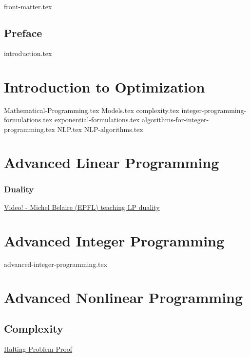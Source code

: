 \documentclass[letter,11pt]{book}
\begin{document}
 
  
{front-matter.tex}



\chapter*{Preface}



{introduction.tex}
\tableofcontents

\part{Introduction to Optimization}
{Mathematical-Programming.tex}
{Models.tex}
{complexity.tex}
{integer-programming-formulations.tex}
{exponential-formulations.tex}
{algorithms-for-integer-programming.tex}
{NLP.tex}
{NLP-algorithms.tex}
\part{Advanced Linear Programming}
\section{Duality}
\href{https://www.youtube.com/watch?v=R3Z1fRXXxyg}{Video! - Michel Belaire (EPFL) teaching LP duality}
\part{Advanced Integer Programming}
{advanced-integer-programming.tex}
\part{Advanced Nonlinear Programming}
\appendix
\chapter{Complexity}
\href{https://www.youtube.com/watch?time_continue=429&v=92WHN-pAFCs}{Halting Problem Proof}
\ifx\footfullcite\undefined  %
  
  
\else                        %
  \printbibliography
\fi
\end{document}
